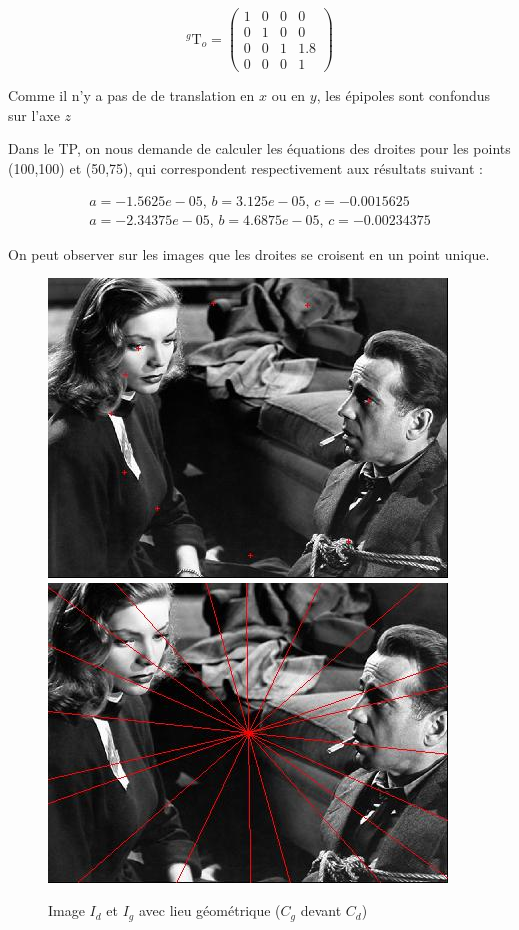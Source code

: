 \documentclass[12pt]{report}
\begin{document}
\[ ^{g}\textrm{T}_o = \begin{pmatrix}
1 & 0 & 0 & 0\\ 
0 & 1 & 0 & 0\\ 
0 & 0 & 1 & 1.8\\
0 & 0 & 0 & 1
\end{pmatrix} \]

Comme il n'y a pas de de translation en $x$ ou en $y$, les épipoles sont confondus sur l'axe $z$

Dans le TP, on nous demande de calculer les équations des droites pour les points (100,100) et (50,75), qui correspondent respectivement aux résultats suivant :

\[\begin{matrix}
a = -1.5625e-05,\, b = 3.125e-05, \, c = -0.0015625\\ 
a = -2.34375e-05,\, b = 4.6875e-05,\, c = -0.00234375
\end{matrix}\] 

On peut observer sur les images que les droites se croisent en un point unique. 


\begin{figure}[H]
\begin{center}
\includegraphics[scale=0.5]{Image/I3d.jpg} 
\includegraphics[scale=0.5]{Image/I3g.jpg} 
\caption{Image $I_d$ et $I_g$ avec lieu géométrique ($C_g$ devant $C_d$)}
\end{center}
\end{figure}
\end{document}
